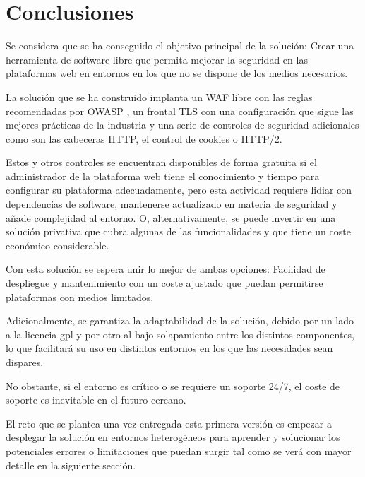 \chapter{Conclusiones}
\par Se considera que se ha conseguido el objetivo principal de la solución: Crear una herramienta de software libre que permita mejorar la
seguridad en las plataformas web en entornos en los que no se dispone de los medios necesarios.

\par La solución que se ha construido implanta un WAF libre con las reglas recomendadas por OWASP \cite{owaspcrs}, un frontal TLS con una configuración que sigue las mejores
prácticas de la industria \cite{TLSBestPractices} y una serie de controles de seguridad adicionales como son las cabeceras HTTP, el control de cookies o HTTP/2.

\par Estos y otros controles se encuentran disponibles de forma gratuita si el administrador de la plataforma web tiene el conocimiento y tiempo para configurar su plataforma
adecuadamente, pero esta actividad requiere lidiar con dependencias de software, mantenerse actualizado en materia de seguridad y añade complejidad al entorno. O,
alternativamente, se puede invertir en una solución privativa que cubra algunas de las funcionalidades y que tiene un coste económico considerable.

\par Con esta solución se espera unir lo mejor de ambas opciones: Facilidad de despliegue y mantenimiento con un coste ajustado que puedan permitirse plataformas con medios
limitados.

\par Adicionalmente, se garantiza la adaptabilidad de la solución, debido por un lado a la licencia  \acrlong{gpl} y por otro al bajo solapamiento entre los distintos componentes,
lo que facilitará su uso en distintos entornos en los que las necesidades sean dispares.

\par No obstante, si el entorno es crítico o se requiere un soporte 24/7, el coste de soporte es inevitable en el futuro cercano.

\par El reto que se plantea una vez entregada esta primera versión es empezar a desplegar la solución en entornos heterogéneos para aprender y solucionar los potenciales errores o
limitaciones que puedan surgir tal como se verá con mayor detalle en la siguiente sección.

